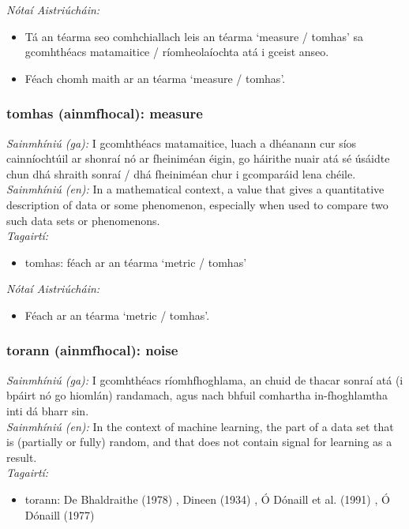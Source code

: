  \noindent \textit{Nótaí Aistriúcháin:}
\begin{itemize}
	\item Tá an téarma seo comhchiallach leis an téarma `measure / tomhas' sa gcomhthéacs matamaitice / ríomheolaíochta atá i gceist anseo.
	\item Féach chomh maith ar an téarma `measure / tomhas'.
\end{itemize}


\subsubsection*{tomhas (ainmfhocal): measure}
 \noindent \textit{Sainmhíniú (ga):} I gcomhthéacs matamaitice, luach a dhéanann cur síos cainníochtúil ar shonraí nó ar fheiniméan éigin, go háirithe nuair atá sé úsáidte chun dhá shraith sonraí / dhá fheiniméan chur i gcomparáid lena chéile.
\\
 \noindent \textit{Sainmhíniú (en):} In a mathematical context, a value that gives a quantitative description of data or some phenomenon, especially when used to compare two such data sets or phenomenons.
\\
 \noindent \textit{Tagairtí:}
\begin{itemize}
	\item tomhas: féach ar an téarma `metric / tomhas'
\end{itemize}

 \noindent \textit{Nótaí Aistriúcháin:}
\begin{itemize}
	\item Féach ar an téarma `metric / tomhas'.
\end{itemize}


\subsubsection*{torann (ainmfhocal): noise}
 \noindent \textit{Sainmhíniú (ga):} I gcomhthéacs ríomhfhoghlama, an chuid de thacar sonraí atá (i bpáirt nó go hiomlán) randamach, agus nach bhfuil comhartha in-fhoghlamtha inti dá bharr sin.
\\
 \noindent \textit{Sainmhíniú (en):} In the context of machine learning, the part of a data set that is (partially or fully) random, and that does not contain signal for learning as a result.
\\
 \noindent \textit{Tagairtí:}
\begin{itemize}
	\item torann: De Bhaldraithe (1978) \cite{de-bhaldraithe}, Dineen (1934) \cite{dineen}, Ó Dónaill et al. (1991) \cite{focloir-beag}, Ó Dónaill (1977) \cite{odonaill}
\end{itemize}

